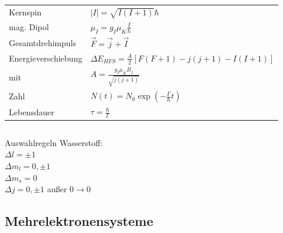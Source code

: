 \documentclass[12pt,a4paper]{article}
\renewcommand{\=}[1]{\stackrel{#1}{=}}
\theoremstyle{definition}
\theoremstyle{remark}
\begin{document}
\begin{center}
\begin{minipage}[t]{.35\linewidth}
\vspace{0pt}
\noindent\begin{tabular}{ll}
\toprule
Kernspin & $|I| = \sqrt{I(I+1)}\hbar$\\
mag. Dipol & $\mu_I = g_I \mu_K \frac{I}{\hbar}$\\
Gesamtdrehimpuls & $\vec F = \vec j + \vec I$\\
Energieverschiebung & $\Delta E_{HFS} = \frac{A}{2} [F(F+1) - j(j+1) - I(I+1)]$\\
mit & $A = \frac{g_I \mu_K B_j}{\sqrt{j(j+1)}}$\\
Zahl & $N(t) = N_0 \exp (-\frac{\Gamma}{\hbar} t)$\\
Lebensdauer & \dotfill $\tau = \frac{\hbar}{\Gamma}$\\
\bottomrule
\end{tabular}
\end{minipage}%
\begin{minipage}[t]{.65\linewidth}
\vspace{0pt}
\begin{tabular}{ll}
\toprule


\end{tabular}
\end{minipage}
\end{center}




Auswahlregeln Wasserstoff:\\
$\Delta l = \pm 1$\\
$\Delta m_l = 0, \pm 1$\\
$\Delta m_s = 0$\\
$\Delta j = 0, \pm 1$ außer $0 \rightarrow 0$\\


\subsection{Mehrelektronensysteme}

\begin{center}
\begin{minipage}[t]{.35\linewidth}
\vspace{0pt}
\noindent\begin{tabular}{ll}
\toprule

\bottomrule
\end{tabular}
\end{minipage}%
\begin{minipage}[t]{.65\linewidth}
\vspace{0pt}
\begin{tabular}{ll}
\toprule


\end{tabular}
\end{minipage}
\end{center}
\end{document}
